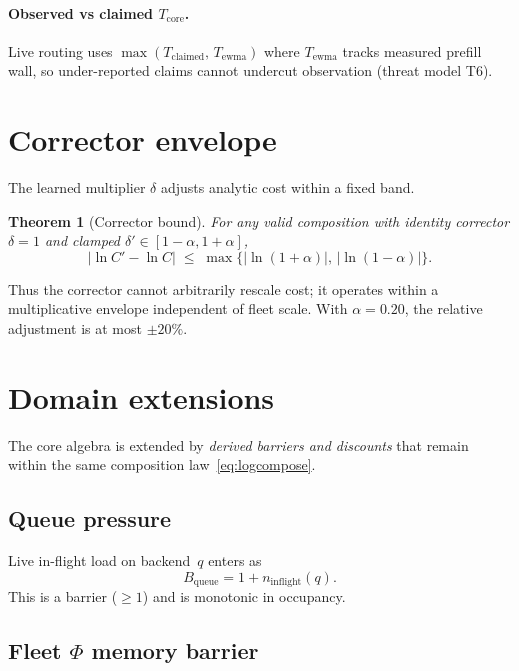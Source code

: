 \documentclass[11pt,a4paper]{article}
\newtheorem{theorem}{Theorem}
\begin{document}
\paragraph{Observed vs claimed $T_{\mathrm{core}}$.}
Live routing uses $\max(T_{\mathrm{claimed}},\, T_{\mathrm{ewma}})$ where
$T_{\mathrm{ewma}}$ tracks measured prefill wall, so under-reported claims
cannot undercut observation (threat model T6).

\section{Corrector envelope}

The learned multiplier $\delta$ adjusts analytic cost within a fixed band.

\begin{theorem}[Corrector bound]\label{thm:corr}
For any valid composition with identity corrector $\delta = 1$ and clamped
$\delta' \in [1-\alpha, 1+\alpha]$,
\[
  \bigl|\ln C' - \ln C\bigr|
  \;\le\;
  \max\bigl\{|\ln(1+\alpha)|,\, |\ln(1-\alpha)|\bigr\}.
\]
\end{theorem}

Thus the corrector cannot arbitrarily rescale cost; it operates within a
multiplicative envelope independent of fleet scale.
With $\alpha = 0.20$, the relative adjustment is at most $\pm 20\%$.

\section{Domain extensions}

The core algebra is extended by \emph{derived barriers and discounts} that
remain within the same composition law~\eqref{eq:logcompose}.

\subsection{Queue pressure}

Live in-flight load on backend~$q$ enters as
\begin{equation}
  B_{\mathrm{queue}} = 1 + n_{\mathrm{inflight}}(q).
\end{equation}
This is a barrier ($\ge 1$) and is monotonic in occupancy.

\subsection{Fleet $\Phi$ memory barrier}
\end{document}
